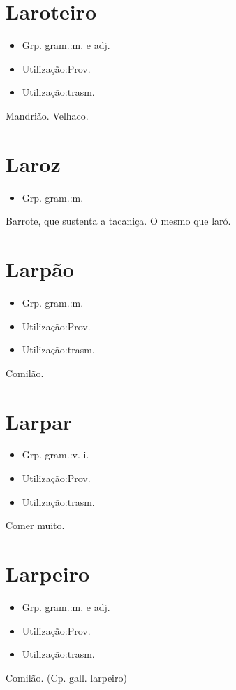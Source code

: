 \section{Laroteiro}
\begin{itemize}
\item {Grp. gram.:m.  e  adj.}
\end{itemize}
\begin{itemize}
\item {Utilização:Prov.}
\end{itemize}
\begin{itemize}
\item {Utilização:trasm.}
\end{itemize}
Mandrião.
Velhaco.
\section{Laroz}
\begin{itemize}
\item {Grp. gram.:m.}
\end{itemize}
Barrote, que sustenta a tacaniça.
O mesmo que \textunderscore laró\textunderscore .
\section{Larpão}
\begin{itemize}
\item {Grp. gram.:m.}
\end{itemize}
\begin{itemize}
\item {Utilização:Prov.}
\end{itemize}
\begin{itemize}
\item {Utilização:trasm.}
\end{itemize}
Comilão.
\section{Larpar}
\begin{itemize}
\item {Grp. gram.:v. i.}
\end{itemize}
\begin{itemize}
\item {Utilização:Prov.}
\end{itemize}
\begin{itemize}
\item {Utilização:trasm.}
\end{itemize}
Comer muito.
\section{Larpeiro}
\begin{itemize}
\item {Grp. gram.:m.  e  adj.}
\end{itemize}
\begin{itemize}
\item {Utilização:Prov.}
\end{itemize}
\begin{itemize}
\item {Utilização:trasm.}
\end{itemize}
Comilão.
(Cp. gall. \textunderscore larpeiro\textunderscore )
